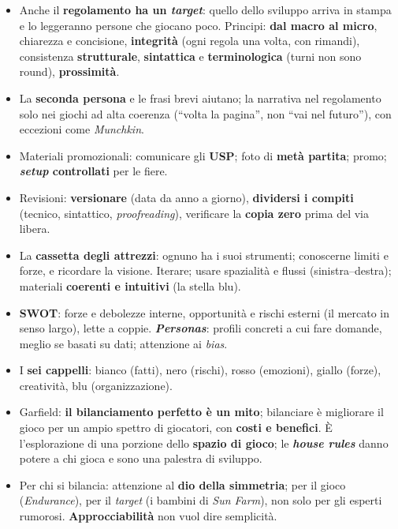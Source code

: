 \begin{itemize}
  \item Anche il \textbf{regolamento ha un \emph{target}}: quello dello sviluppo arriva in
        stampa e lo leggeranno persone che giocano poco. Principi: \textbf{dal macro al
        micro}, chiarezza e concisione, \textbf{integrità} (ogni regola una volta, con
        rimandi), consistenza \textbf{strutturale}, \textbf{sintattica} e
        \textbf{terminologica} (turni non sono round), \textbf{prossimità}.
  \item La \textbf{seconda persona} e le frasi brevi aiutano; la narrativa nel regolamento
        solo nei giochi ad alta coerenza (``volta la pagina'', non ``vai nel futuro''), con
        eccezioni come \emph{Munchkin}.
  \item Materiali promozionali: comunicare gli \textbf{USP}; foto di \textbf{metà partita};
        promo; \textbf{\emph{setup} controllati} per le fiere.
  \item Revisioni: \textbf{versionare} (data da anno a giorno), \textbf{dividersi i compiti}
        (tecnico, sintattico, \emph{proofreading}), verificare la \textbf{copia zero} prima
        del via libera.
  \item La \textbf{cassetta degli attrezzi}: ognuno ha i suoi strumenti; conoscerne limiti e
        forze, e ricordare la visione. Iterare; usare spazialità e flussi (sinistra--destra);
        materiali \textbf{coerenti e intuitivi} (la stella blu).
  \item \textbf{SWOT}: forze e debolezze interne, opportunità e rischi esterni (il mercato in
        senso largo), lette a coppie. \textbf{\emph{Personas}}: profili concreti a cui fare
        domande, meglio se basati su dati; attenzione ai \emph{bias}.
  \item I \textbf{sei cappelli}: bianco (fatti), nero (rischi), rosso (emozioni), giallo
        (forze), creatività, blu (organizzazione).
  \item Garfield: \textbf{il bilanciamento perfetto è un mito}; bilanciare è migliorare il
        gioco per un ampio spettro di giocatori, con \textbf{costi e benefici}. È
        l'esplorazione di una porzione dello \textbf{spazio di gioco}; le \textbf{\emph{house
        rules}} danno potere a chi gioca e sono una palestra di sviluppo.
  \item Per chi si bilancia: attenzione al \textbf{dio della simmetria}; per il gioco
        (\emph{Endurance}), per il \emph{target} (i bambini di \emph{Sun Farm}), non solo per
        gli esperti rumorosi. \textbf{Approcciabilità} non vuol dire semplicità.

\end{itemize}
